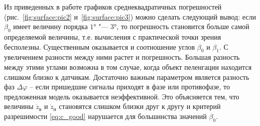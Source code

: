 \documentclass[../main.tex]{subfiles}
\begin{document}
Из приведенных в работе графиков среднеквадратичных погрешностей (рис.~\ref{fig:surface:pic2} и~\ref{fig:surface:pic3}) можно сделать следующий вывод: если $\beta_0$ имеет величину порядка $\ang{1}$ "--- $\ang{3}$, то погрешность становится больше самой определяемой величины, т.е. вычисления с практической точки зрения бесполезны. Существенным оказывается и соотношение углов $\beta_0$ и $\beta_1$. С увеличением разности между ними растет и погрешность. Большая разность между этими углами возможна в том случае, когда объект пеленгации находится слишком близко к датчикам. Достаточно важным параметром является разность фаз $\Delta \varphi$ – если пришедшие сигналы приходят в фазе или противофазе, то предложенная модель оказывается неэффективной. Это объясняется тем, что величины $\dot{z}_\text{в}$ и $\dot{z}_\text{н}$ становятся слишком близки друг к другу и критерий разрешимости \eqref{eq:c_good} нарушается для большинства значений $\beta_0$.
\end{document}
